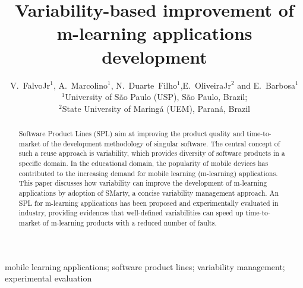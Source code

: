 \documentclass{kais}
\begin{document}
\label{firstpage}

\title{Variability-based improvement of m-learning applications development}

\author[FalvoJr et al]{V.~FalvoJr$^1$, A.~Marcolino$^1$, N.~Duarte~Filho$^1$,E.~OliveiraJr$^2$ and
E.~Barbosa$^1$\\ $^1$University of S\~ao Paulo (USP), S\~ao Paulo, Brazil;\\$^2$State University of Maring\'a (UEM), Paran\'a, Brazil}
 
\maketitle

\begin{abstract}
Software Product Lines (SPL) aim at improving the product quality and time-to-market of the development methodology of singular software. The central concept of such a reuse approach is variability, which provides diversity of software products in a specific domain. In the educational domain, the popularity of mobile devices has contributed to the increasing demand for mobile learning (m-learning) applications. This paper discusses how variability can improve the development of m-learning applications by adoption of SMarty, a concise variability management approach. An SPL for m-learning applications has been proposed and experimentally evaluated in industry, providing evidences that well-defined variabilities can speed up time-to-market of m-learning products with a reduced number of faults.
\end{abstract}

\begin{keywords}
mobile learning applications; software product lines; variability management; experimental evaluation
\end{keywords}
















\end{document}
